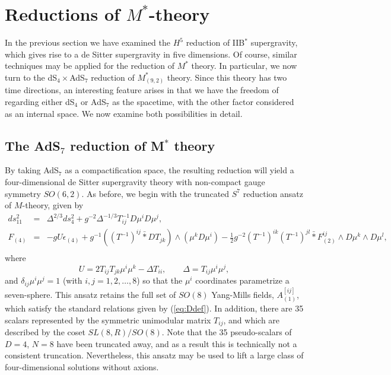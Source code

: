 \documentclass[a4paper,12pt]{article}
\begin{document}
\section{Reductions of $M^*$-theory}

In the previous section we have examined the $H^5$ reduction of IIB$^*$
supergravity, which gives rise to a de Sitter supergravity in five
dimensions.  Of course, similar techniques may be applied for the reduction
of $M^*$ theory.  In particular, we now turn to the dS$_4\times$AdS$_7$
reduction of $M^*_{(9,2)}$ theory.  Since this theory has two time
directions, an interesting feature arises in that we have the freedom of
regarding either dS$_4$ or AdS$_7$ as the spacetime, with the other factor
considered as an internal space.  We now examine both possibilities
in detail.

\subsection{The AdS$_7$ reduction of M$^*$ theory}

By taking AdS$_7$ as a compactification space, the resulting reduction
will yield a four-dimensional de Sitter supergravity theory with
non-compact gauge symmetry $SO(6,2)$.  As before, we begin with the 
truncated $S^7$ reduction ansatz of $M$-theory, given by
\cite{Cvetic:1999xx}
%
\begin{eqnarray}
ds^2_{11}&=&\Delta^{2/3}ds_4^2+g^{-2}\Delta^{-1/3}T_{ij}^{-1}D\mu^iD\mu^j,\\
F_{(4)}&=&-gU\epsilon_{(4)}+g^{-1}((T^{-1})^{ij}\bar{\ast}DT_{jk})
\wedge(\mu^kD\mu^i) 
-\frac{1}{2}g^{-2}(T^{-1})^{ik}(T^{-1})^{jl}\bar{\ast} F^{ij}_{(2)}
\wedge D\mu^k \wedge D\mu^l,\nonumber\\
\end{eqnarray}
%
where
%
\begin{equation}
U=2T_{ij}T_{jk} \mu^i \mu^k -\Delta T_{ii},\qquad\Delta=T_{ij}\mu^i \mu^j,
\end{equation}
%
and $\delta_{ij}\mu^i\mu^j=1$ (with $i,j=1,2,\ldots,8$) so that the
$\mu^i$ coordinates parametrize a seven-sphere.  This ansatz
retains the full set of $SO(8)$ Yang-Mills fields, $A_{(1)}^{[ij]}$,
which satisfy the standard relations given by (\ref{eq:Ddef}).  In
addition, there are 35 scalars represented by the symmetric unimodular
matrix $T_{ij}$, and which are described by the coset $SL(8,R)/SO(8)$.
Note that the 35 pseudo-scalars of $D=4$, $N=8$ have been truncated
away, and as a result this is technically not a consistent
truncation.  Nevertheless, this ansatz may be used to lift a large
class of four-dimensional solutions without axions.
\end{document}
